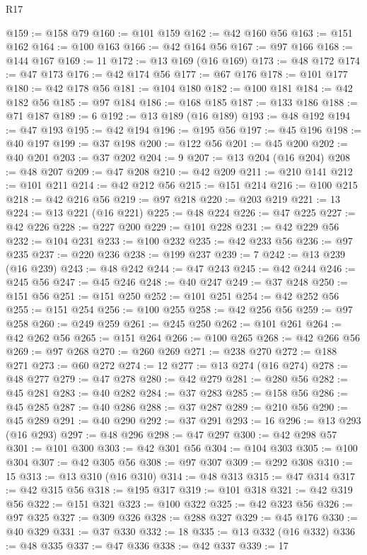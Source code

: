 \begin{lexlean}{R17}
\begin{coremodule}
@159 := @158 @79
@160 := @101 @159
@162 := @42 @160 @56
@163 := @151 @162
@164 := @100 @163
@166 := @42 @164 @56
@167 := @97 @166
@168 := @144 @167
@169 := 11
@172 := @13 @169 (@16 @169)
@173 := @48 @172
@174 := @47 @173
@176 := @42 @174 @56
@177 := @67 @176
@178 := @101 @177
@180 := @42 @178 @56
@181 := @104 @180
@182 := @100 @181
@184 := @42 @182 @56
@185 := @97 @184
@186 := @168 @185
@187 := @133 @186
@188 := @71 @187
@189 := 6
@192 := @13 @189 (@16 @189)
@193 := @48 @192
@194 := @47 @193
@195 := @42 @194
@196 := @195 @56
@197 := @45 @196
@198 := @40 @197
@199 := @37 @198
@200 := @122 @56
@201 := @45 @200
@202 := @40 @201
@203 := @37 @202
@204 := 9
@207 := @13 @204 (@16 @204)
@208 := @48 @207
@209 := @47 @208
@210 := @42 @209
@211 := @210 @141
@212 := @101 @211
@214 := @42 @212 @56
@215 := @151 @214
@216 := @100 @215
@218 := @42 @216 @56
@219 := @97 @218
@220 := @203 @219
@221 := 13
@224 := @13 @221 (@16 @221)
@225 := @48 @224
@226 := @47 @225
@227 := @42 @226
@228 := @227 @200
@229 := @101 @228
@231 := @42 @229 @56
@232 := @104 @231
@233 := @100 @232
@235 := @42 @233 @56
@236 := @97 @235
@237 := @220 @236
@238 := @199 @237
@239 := 7
@242 := @13 @239 (@16 @239)
@243 := @48 @242
@244 := @47 @243
@245 := @42 @244
@246 := @245 @56
@247 := @45 @246
@248 := @40 @247
@249 := @37 @248
@250 := @151 @56
@251 := @151 @250
@252 := @101 @251
@254 := @42 @252 @56
@255 := @151 @254
@256 := @100 @255
@258 := @42 @256 @56
@259 := @97 @258
@260 := @249 @259
@261 := @245 @250
@262 := @101 @261
@264 := @42 @262 @56
@265 := @151 @264
@266 := @100 @265
@268 := @42 @266 @56
@269 := @97 @268
@270 := @260 @269
@271 := @238 @270
@272 := @188 @271
@273 := @60 @272
@274 := 12
@277 := @13 @274 (@16 @274)
@278 := @48 @277
@279 := @47 @278
@280 := @42 @279
@281 := @280 @56
@282 := @45 @281
@283 := @40 @282
@284 := @37 @283
@285 := @158 @56
@286 := @45 @285
@287 := @40 @286
@288 := @37 @287
@289 := @210 @56
@290 := @45 @289
@291 := @40 @290
@292 := @37 @291
@293 := 16
@296 := @13 @293 (@16 @293)
@297 := @48 @296
@298 := @47 @297
@300 := @42 @298 @57
@301 := @101 @300
@303 := @42 @301 @56
@304 := @104 @303
@305 := @100 @304
@307 := @42 @305 @56
@308 := @97 @307
@309 := @292 @308
@310 := 15
@313 := @13 @310 (@16 @310)
@314 := @48 @313
@315 := @47 @314
@317 := @42 @315 @56
@318 := @195 @317
@319 := @101 @318
@321 := @42 @319 @56
@322 := @151 @321
@323 := @100 @322
@325 := @42 @323 @56
@326 := @97 @325
@327 := @309 @326
@328 := @288 @327
@329 := @45 @176
@330 := @40 @329
@331 := @37 @330
@332 := 18
@335 := @13 @332 (@16 @332)
@336 := @48 @335
@337 := @47 @336
@338 := @42 @337
@339 := 17

\end{coremodule}
\end{lexlean}
